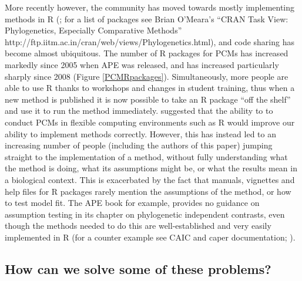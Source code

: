 \documentclass[a4paper,12pt]{article}
\begin{document}
    More recently however, the community has moved towards mostly implementing methods in R (\citealp{R-Core-Team:2014aa}; for a list of packages see Brian O'Meara's ``CRAN Task View: Phylogenetics, Especially Comparative Methods'' http://ftp.iitm.ac.in/cran/web/views/Phylogenetics.html), and code sharing has become almost ubiquitous. 
    The number of R packages for PCMs has increased markedly since 2005 when APE \citep{Paradis:2004aa} was released, and has increased particularly sharply since 2008 (Figure \ref{PCMRpackages}).
    Simultaneously, more people are able to use R thanks to workshops and changes in student training, thus when a new method is published it is now possible to take an R package ``off the shelf'' and use it to run the method immediately.
    \citet{freckleton2009seven} suggested that the ability to to conduct PCMs in flexible computing environments such as R would improve our ability to implement methods correctly. 
    However, this has instead led to an increasing number of people (including the authors of this paper) jumping straight to the implementation of a method, without fully understanding what the method is doing, what its assumptions might be, or what the results mean in a biological context.
    This is exacerbated by the fact that manuals, vignettes and help files for R packages rarely mention the assumptions of the method, or how to test model fit. 
    The APE book \citep{paradis2011analysis} for example, provides no guidance on assumption testing in its chapter on phylogenetic independent contrasts, even though the methods needed to do this are well-established and very easily implemented in R (for a counter example see CAIC and caper documentation; \citealp{purvis1995comparative,Orme:2013aa}).

\subsection{How can we solve some of these problems?}
\end{document}
